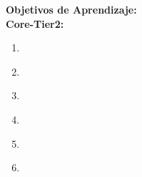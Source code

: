 \noindent \textbf{Objetivos de Aprendizaje:}\\
\noindent \textbf{Core-Tier2:}
\begin{enumerate}
	\setcounter{enumi}{0}
	\item \ARMemorysystemorganizationandarchitectureLOIdentify\xspace[\ARMemorysystemorganizationandarchitectureLOIdentifyLevel]\label{sec:BOK:ARMemorysystemorganizationandarchitectureLOIdentify}
	\item \ARMemorysystemorganizationandarchitectureLOExplainTheMemory\xspace[\ARMemorysystemorganizationandarchitectureLOExplainTheMemoryLevel]\label{sec:BOK:ARMemorysystemorganizationandarchitectureLOExplainTheMemory}
	\item \ARMemorysystemorganizationandarchitectureLODescribeHowOf\xspace[\ARMemorysystemorganizationandarchitectureLODescribeHowOfLevel]\label{sec:BOK:ARMemorysystemorganizationandarchitectureLODescribeHowOf}
	\item \ARMemorysystemorganizationandarchitectureLODescribeTheMemory\xspace[\ARMemorysystemorganizationandarchitectureLODescribeTheMemoryLevel]\label{sec:BOK:ARMemorysystemorganizationandarchitectureLODescribeTheMemory}
	\item \ARMemorysystemorganizationandarchitectureLOExplainTheA\xspace[\ARMemorysystemorganizationandarchitectureLOExplainTheALevel]\label{sec:BOK:ARMemorysystemorganizationandarchitectureLOExplainTheA}
	\item \ARMemorysystemorganizationandarchitectureLOCompute\xspace[\ARMemorysystemorganizationandarchitectureLOComputeLevel]\label{sec:BOK:ARMemorysystemorganizationandarchitectureLOCompute}
\end{enumerate}


